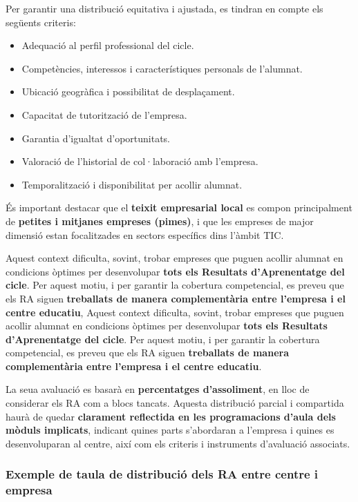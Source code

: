 \documentclass[
  paper=a4,
  ,captions=tableheading
]{scrartcl}
\providecommand{\tightlist}{%
  \setlength{\itemsep}{0pt}\setlength{\parskip}{0pt}}
\begin{document}
Per garantir una distribució equitativa i ajustada, es tindran en compte
els següents criteris:

\begin{itemize}
\tightlist
\item
  Adequació al perfil professional del cicle.
\item
  Competències, interessos i característiques personals de l'alumnat.
\item
  Ubicació geogràfica i possibilitat de desplaçament.
\item
  Capacitat de tutorització de l'empresa.
\item
  Garantia d'igualtat d'oportunitats.
\item
  Valoració de l'historial de col·laboració amb l'empresa.
\item
  Temporalització i disponibilitat per acollir alumnat.
\end{itemize}

És important destacar que el \textbf{teixit empresarial local} es compon
principalment de \textbf{petites i mitjanes empreses (pimes)}, i que les
empreses de major dimensió estan focalitzades en sectors específics dins
l'àmbit TIC.

Aquest context dificulta, sovint, trobar empreses que puguen acollir
alumnat en condicions òptimes per desenvolupar \textbf{tots els
Resultats d'Aprenentatge del cicle}. Per aquest motiu, i per garantir la
cobertura competencial, es preveu que els RA siguen \textbf{treballats
de manera complementària entre l'empresa i el centre educatiu}, Aquest
context dificulta, sovint, trobar empreses que puguen acollir alumnat en
condicions òptimes per desenvolupar \textbf{tots els Resultats
d'Aprenentatge del cicle}. Per aquest motiu, i per garantir la cobertura
competencial, es preveu que els RA siguen \textbf{treballats de manera
complementària entre l'empresa i el centre educatiu}.

La seua avaluació es basarà en \textbf{percentatges d'assoliment}, en
lloc de considerar els RA com a blocs tancats. Aquesta distribució
parcial i compartida haurà de quedar \textbf{clarament reflectida en les
programacions d'aula dels mòduls implicats}, indicant quines parts
s'abordaran a l'empresa i quines es desenvoluparan al centre, així com
els criteris i instruments d'avaluació associats.

\hypertarget{exemple-de-taula-de-distribuciuxf3-dels-ra-entre-centre-i-empresa}{%
\subsubsection{Exemple de taula de distribució dels RA entre centre i
empresa}\label{exemple-de-taula-de-distribuciuxf3-dels-ra-entre-centre-i-empresa}}
\end{document}
